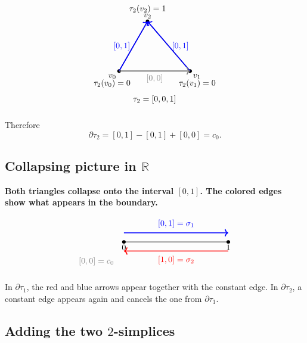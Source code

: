 \documentclass[12pt,a4paper]{article}
\theoremstyle{notespace}
\begin{document}
\[
\begin{tikzpicture}[scale=1.5]
	\coordinate (A) at (0,0);
	\coordinate (B) at (2,0);
	\coordinate (C) at (0.8,1.4);
	
	\draw[thick] (A)--(B)--(C)--cycle;
	
	\fill (A) circle (1.5pt) node[below left] {\(v_0\)};
	\fill (B) circle (1.5pt) node[below right] {\(v_1\)};
	\fill (C) circle (1.5pt) node[above] {\(v_2\)};
	
	\node at (-0.2,-0.35) {\(\tau_2(v_0)=0\)};
	\node at (2.2,-0.35) {\(\tau_2(v_1)=0\)};
	\node at (0.8,1.75) {\(\tau_2(v_2)=1\)};
	
	\draw[->, very thick, blue] (B) -- (C) node[midway, right] {\([0,1]\)};
	\draw[->, very thick, blue] (A) -- (C) node[midway, left] {\([0,1]\)};
	\draw[->, very thick, gray] (A) -- (B) node[midway, below] {\([0,0]\)};
	
	\node at (1,-0.8) {\(\tau_2=[0,0,1]\)};
\end{tikzpicture}
\]

Therefore
\[
\partial\tau_2=[0,1]-[0,1]+[0,0]=c_0.
\]

\subsection{Collapsing picture in \(\mathbb{R}\)}

\textbf{Both triangles collapse onto the interval \([0,1]\). The colored edges show what appears in the boundary.}

\[
\begin{tikzpicture}[scale=1.1]
	\draw[thick] (0,0)--(4,0);
	\fill (0,0) circle (2pt) node[below] {\(0\)};
	\fill (4,0) circle (2pt) node[below] {\(1\)};
	
	\draw[->, very thick, blue] (0,0.35)--(4,0.35)
	node[midway, above=2pt] {\([0,1]=\sigma_1\)};
	\draw[<-, very thick, red] (0,-0.35)--(4,-0.35)
	node[midway, below=2pt] {\([1,0]=\sigma_2\)};
	\draw[very thick, gray] (0,-0.75)--(0,-0.75)
	node[left=8pt] {\([0,0]=c_0\)};
\end{tikzpicture}
\]

In \(\partial\tau_1\), the red and blue arrows appear together with the constant edge.  
In \(\partial\tau_2\), a constant edge appears again and cancels the one from \(\partial\tau_1\).

\subsection{Adding the two \(2\)-simplices}
\end{document}
